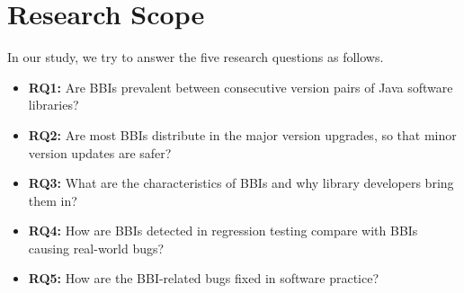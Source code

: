 
\section{Research Scope}



In our study, we try to answer the five research questions as follows. 




\begin{itemize}

	\item \textbf{RQ1:} Are BBIs prevalent between consecutive version pairs of Java software libraries?

	\item \textbf{RQ2:} Are most BBIs distribute in the major version upgrades, so that minor version updates are safer?

	\item \textbf{RQ3:} What are the characteristics of BBIs and why library developers bring them in?

	\item \textbf{RQ4:} How are BBIs detected in regression testing compare with BBIs causing real-world bugs?

	\item \textbf{RQ5:} How are the BBI-related bugs fixed in software practice?
\end{itemize}

